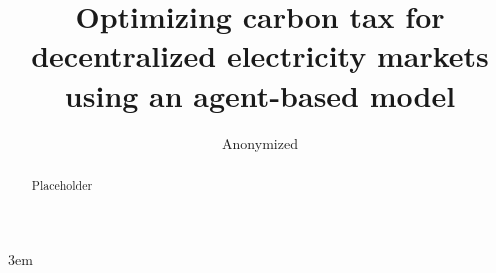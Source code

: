\documentclass[sigconf]{acmart}
\begin{document}
\emergencystretch 3em

\title{Optimizing carbon tax for decentralized electricity markets using an agent-based model}

%
%
\author{Anonymized}
\renewcommand{\shortauthors}{Kell et al.}

\begin{abstract}
 
 Placeholder
 
\end{abstract}




\end{document}
